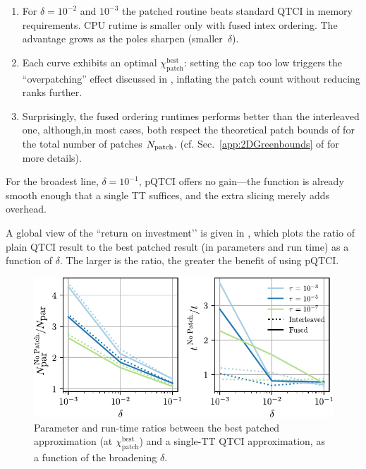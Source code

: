 \begin{enumerate}
\item For \(\delta=10^{-2}\) and \(10^{-3}\) the patched routine beats standard QTCI in memory requirements. CPU rutime is smaller only with fused intex ordering. The advantage grows as the poles sharpen (smaller~\(\delta\)).

\item Each curve exhibits an optimal
      \(\chi_{\text{patch}}^{\mathrm{best}}\): setting the cap too low triggers the ``overpatching'' effect discussed in
      , inflating the patch count without reducing ranks further.

\item Surprisingly, the fused ordering runtimes performs better than the interleaved one, although,in most cases, both respect the theoretical patch bounds of  for the total number of patches $N_{\text{patch}}$. (cf. Sec.~\ref{app:2DGreenbounds} of  for more details).
\end{enumerate}

For the broadest line, \(\delta=10^{-1}\), pQTCI offers no gain—the function is already smooth enough that a single TT suffices, and the extra slicing merely adds overhead.

A global view of the “return on investment’’ is given in , which plots the ratio of plain QTCI result to the best patched result (in parameters and run time) as a function of \(\delta\).  The larger is the ratio, the greater the benefit of using pQTCI.

\begin{figure}[ht!]
    \centering
    \includegraphics{figures/localisationParam2DGreen.pdf}
    \caption{Parameter and run-time ratios between the best patched approximation (at \(\chi_{\text{patch}}^{\mathrm{best}}\)) and a single-TT QTCI
    approximation, as a function of the broadening \(\delta\).} 
    \label{fig:deltavsMemoryTime}
\end{figure}

